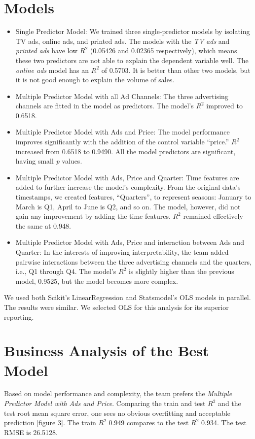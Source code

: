 \section{Models}
\begin{itemize}
  \item Single Predictor Model: We trained three single-predictor models by isolating TV ads, online ads, and printed ads. The models with the \emph{TV ads} and \emph{printed ads} have low $R^2$ (0.05426 and 0.02365 respectively), which means these two predictors are not able to explain the dependent variable well. The \emph{online ads} model has an $R^2$ of 0.5703. It is better than other two models, but it is not good enough to explain the volume of sales.
  \item Multiple Predictor Model with all Ad Channels: The three advertising channels are fitted in the model as predictors. The model’s $R^2$ improved to 0.6518.
  \item Multiple Predictor Model with Ads and Price: The model performance improves significantly with the addition of the control variable ``price.'' $R^2$ increased from 0.6518 to 0.9490. All the model predictors are significant, having small \emph{p} values. 
  \item Multiple Predictor Model with Ads, Price and Quarter: Time features are added to further increase the model’s complexity. From the original data’s timestamps, we created features, ``Quarters'', to represent seasons: January to March is Q1, April to June is Q2, and so on. The model, however, did not gain any improvement by adding the time features. $R^2$ remained effectively the same at 0.948.
  \item Multiple Predictor Model with Ads, Price and interaction between Ads and Quarter: In the interests of improving interpretability, the team added pairwise interactions between the three advertising channels and the quarters, i.e., Q1 through Q4. The model’s $R^2$ is slightly higher than the previous model, 0.9525, but the model becomes more complex.
\end{itemize}
We used both Scikit's LinearRegression and Statsmodel's OLS models in parallel. The results were similar. We selected OLS for this analysis for its superior reporting.

\section{Business Analysis of the Best Model}
Based on model performance and complexity, the team prefers the \emph{Multiple Predictor Model with Ads and Price}. Comparing the train and test $R^2$ and the test root mean square error, one sees no obvious overfitting and acceptable prediction [figure 3]. The train $R^2$ 0.949 compares to the test $R^2$ 0.934. The test RMSE is 26.5128.

